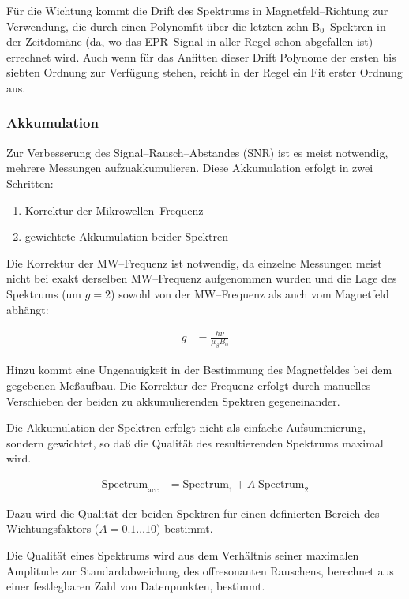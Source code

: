 \documentclass[a4paper]{refart}
\begin{document}
Für die Wichtung kommt die Drift des Spektrums in Magnetfeld--Richtung zur
Verwendung, die durch einen Polynomfit über die letzten zehn B$_0$--Spektren in
der Zeitdomäne (da, wo das EPR--Signal in aller Regel schon abgefallen ist)
errechnet wird. Auch wenn für das Anfitten dieser Drift Polynome der ersten bis
siebten Ordnung zur Verfügung stehen, reicht in der Regel ein Fit erster Ordnung
aus.


\subsubsection{Akkumulation}

Zur Verbesserung des Signal--Rausch--Abstandes (SNR) ist es meist notwendig,
mehrere Messungen aufzuakkumulieren. Diese Akkumulation erfolgt in zwei
Schritten:
 
\begin{enumerate}
  \item Korrektur der Mikrowellen--Frequenz
  \item gewichtete Akkumulation beider Spektren
\end{enumerate}

Die  Korrektur der MW--Frequenz ist notwendig,
da einzelne Messungen meist nicht bei exakt derselben MW--Frequenz aufgenommen
wurden und die Lage des Spektrums (um $g=2$) sowohl von der MW--Frequenz als auch vom
Magnetfeld abhängt:

\begin{align*} 
g &= \frac{h\nu}{\mu_{\beta}B_0}
\end{align*}

Hinzu kommt eine Ungenauigkeit in der Bestimmung des Magnetfeldes bei dem
gegebenen Meßaufbau. Die Korrektur der Frequenz erfolgt durch manuelles
Verschieben der beiden zu akkumulierenden Spektren gegeneinander.

Die  Akkumulation der Spektren erfolgt
nicht als einfache Aufsummierung, sondern gewichtet, so daß die Qualität des
resultierenden Spektrums maximal wird.

\begin{align*}
  \text{Spectrum}_\text{acc} &= \text{Spectrum}_1 + A \; \text{Spectrum}_2
\end{align*}

Dazu wird die Qualität der beiden Spektren für einen definierten Bereich des 
Wichtungsfaktors ($A = 0.1 \dots 10$) bestimmt.

Die Qualität eines Spektrums wird aus dem Verhältnis seiner maximalen Amplitude
zur Standardabweichung des offresonanten Rauschens, berechnet aus einer
festlegbaren Zahl von Datenpunkten, bestimmt.
\end{document}
